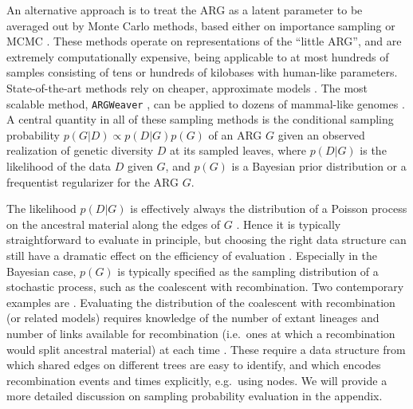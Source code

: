 \documentclass{article}
\begin{document}
An alternative approach is to treat the ARG as a latent parameter to be
averaged out by Monte Carlo methods, based either on importance sampling
\citep{griffiths1996ancestral, fearnhead2001estimating, jenkins2011inference}
or MCMC \citep{kuhner2000maximum, nielsen2000estimation, wang2008bayesian,
fallon2013acg, mahmoudi2022bayesian}. These methods operate on representations
of the ``little ARG'', and are extremely computationally expensive, being
applicable to at most hundreds of samples consisting of tens or hundreds of
kilobases with human-like parameters. State-of-the-art methods rely on cheaper,
approximate models \citep{didelot2010inference, heine2018bridging,
hubisz2020mapping,hubisz2020inference, medina2020speeding}. The most scalable
method, \texttt{ARGWeaver} \citep{rasmussen2014genome}, can be applied to
dozens of mammal-like genomes \citep{hubisz2020inference}. A central quantity
in all of these sampling methods is the conditional sampling probability $p(G |
D) \propto p(D | G) p(G)$ of an ARG $G$ given an observed realization of
genetic diversity $D$ at its sampled leaves, where $p(D | G)$ is the likelihood
of the data $D$ given $G$, and $p(G)$ is a Bayesian prior distribution or a
frequentist regularizer for the ARG $G$.

The likelihood $p(D | G)$ is effectively always the distribution of a Poisson
process on the ancestral material along the edges of $G$ \citep[Eq.\
(2)]{mahmoudi2022bayesian}. Hence it is typically straightforward to evaluate
in principle, but choosing the right data structure can still have a dramatic
effect on the efficiency of evaluation \citep{mahmoudi2022bayesian}. Especially
in the Bayesian case, $p(G)$ is typically specified as the sampling
distribution of a stochastic process, such as the coalescent with
recombination. Two contemporary examples are \cite{mahmoudi2022bayesian,
guo2022recombination}. Evaluating the distribution of the coalescent with
recombination (or related models) requires knowledge of the number of extant
lineages and number of links available for recombination (i.e.\ ones at which a
recombination would split ancestral material) at each time \citep[Eq.\
(3)]{mahmoudi2022bayesian}. These require a data structure from which shared
edges on different trees are easy to identify, and which encodes recombination
events and times explicitly, e.g.\ using nodes.
We will provide a more detailed discussion on sampling probability evaluation in the appendix.
\end{document}
